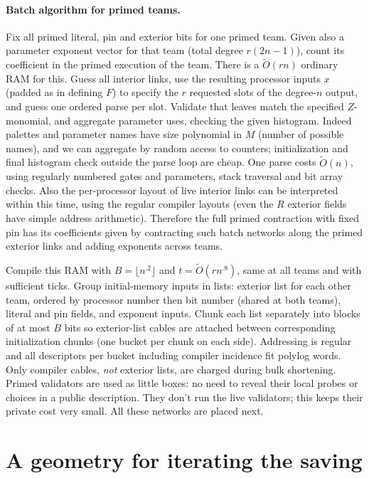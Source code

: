 \documentclass[11pt,letterpaper]{article}
\theoremstyle{definition}
\numberwithin{equation}{section}
\begin{document}
\paragraph{Batch algorithm for primed teams.}
Fix all primed literal, pin and exterior bits for one
primed team. Given also a parameter exponent vector for that team (total degree $r(2n-1)$),
count its coefficient in the primed execution of the team. There is a $\widetilde{O}(rn)$ ordinary RAM
for this. Guess all interior links, use the resulting processor inputs $x$ (padded as in defining
$F$) to specify the $r$ requested slots of the degree-$n$ output, and guess one ordered parse per
slot. Validate that leaves match the specified $Z$-monomial, and aggregate parameter uses,
checking the given histogram. Indeed palettes and parameter names have size polynomial
in $M$ (number of possible names), and we can aggregate by random access to counters;
initialization and final histogram check outside the parse loop are cheap. One parse costs
$\widetilde{O}(n)$, using regularly numbered gates and parameters, stack traversal and bit array checks.
Also the per-processor layout of live interior links can be interpreted within this time, using
the regular compiler layouts (even the $R$ exterior fields have simple address arithmetic).
Therefore the full primed contraction with fixed pin has its coefficients given by contracting
such batch networks along the primed exterior links and adding exponents across teams.

Compile this RAM with $B=\lfloor n^{.2}\rfloor$ and $t=\widetilde{O}(rn^{.8})$, same at all teams
and with sufficient
ticks. Group initial-memory inputs in lists: exterior list for each other team, ordered
by processor number then bit number (shared at both teams), literal and pin fields, and
exponent inputs. Chunk each list separately into blocks of at most $B$ bits so exterior-list
cables are attached between corresponding initialization chunks (one bucket per chunk on
each side). Addressing is regular and all descriptors per bucket including compiler incidence
fit polylog words. Only compiler cables, \emph{not} exterior lists, are charged during bulk shortening.
Primed validators are used as little boxes: no need to reveal their local probes or choices in
a public description. They don't run the live validators; this keeps their private cost very
small. All these networks are placed next.

\section{A geometry for iterating the saving}\label{sec:packing}
\end{document}
